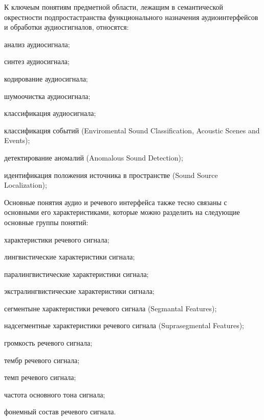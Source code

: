 К ключеым понятиям предметной области, лежащим в семантической окрестности подпростастранства функционального назначения аудиоинтерфейсов и обработки аудиосгигналов, относятся:
\begin{textitemize}    
    \item анализ аудиосигнала;
    \item синтез аудиосигнала;
    \item кодирование аудиосигнала;
    \item шумоочистка аудиосигнала;
    \item классификация аудиосигнала;
    \item классификация событий (Enviromental Sound Classification, Acoustic Scenes and Events);
    \item детектирование аномалий (Anomalous Sound Detection);
    \item идентификация положения источника в пространстве (Sound Source Localization);
\end{textitemize}

Основные понятия аудио и речевого интерфейса также тесно связаны с основными его характеристиками, которые можно разделить на следующие основные группы понятий:
\begin{textitemize}
    \item характеристики речевого сигнала;
    \item лингвистические характеристики сигнала;
    \item паралингвистические характеристики сигнала;
    \item экстралингвистические характеристики сигнала;
    \item сегментыне характеристики речевого сигнала (Segmantal Features);
    \item надсегментные характеристики речевого сигнала (Suprasegmental Features);
    \item громкость речевого сигнала;
    \item тембр речевого сигнала;
    \item темп речевого сигнала;
    \item частота основного тона сигнала;
    \item фонемный состав речевого сигнала.
\end{textitemize}

